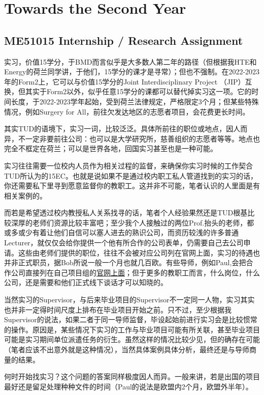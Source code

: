 \vspace{\betsubsec} %
\section{Towards the Second Year}
\subsection{ME51015 Internship / Research Assignment}
实习，价值15学分，于BMD而言似乎是大多数人第二年的路径（但根据我HTE和Energy的荷兰同学讲，于他们，15学分的课才是寻常）；但也不强制。在2022-2023年的Form2上，它可以与价值15学分的Joint Interdisciplinary Project （JIP）互换，但其实于Form2以外，似乎任意15学分的课都可以替代掉实习这一项。它的时间长度，于2022-2023学年起始，受到荷兰法律规定，严格限定3个月；但某些特殊情况，例如Surgery for All，前往欠发达地区的志愿者项目，会花费更长时间。

其实TUD的语境下，实习一词，比较泛泛。具体所前往的职位或地点，因人而异，不一定非要前往公司：也可以是大学研究所，慈善组织的志愿者等等。地点也完全不框定在荷兰；可以是世界各地，回国实习甚至也是一种可能。

实习往往需要一位校内人员作为相关过程的监督，来确保你实习时候的工作契合TUD所认为的15EC。也就是说如果不是通过校内职工私人管道找到的实习的话，你还需要私下里寻到愿意监督你的教职工。这并非不可能，笔者认识的人里面是有相关案例的。

而若是希望透过校内教授私人关系找寻的话，笔者个人经验果然还是TUD根基比较深厚的老师们资源比较丰富吧；至少我个人接触过的两位Prof.抬头的老师，都或多或少有着让他们自信可以塞人进去的熟识公司，而资历较浅的许多普通Lecturer，就仅仅会给你提供一个他有所合作的公司表单，仍需要自己去公司申请。这些由老师们提供的职位，往往不会被对应公司列在官网上面，实习的待遇也并非正式职员，据Bob所说一般一个月也就几百欧。有些导师，例如Paul,会把合作公司直接列在自己项目组的\href{https://www.bitegroup.nl/internships/}{\uline{官网上面}}；但于更多的教职工而言，什么岗位，什么公司，还是需要和他们正式线下谈话才可以知晓的。

当然实习的Supervisor，与后来毕业项目的Supervisor不一定同一人物，实习其实也并非一定得时间尺度上排布在毕业项目开始之前。只不过，至少根据我Supervisor的说法，如果二者于同一导师监督，毕设起始前进行实习会是比较惯常的操作。原因是，某些情况下实习的工作与毕业项目可能有所关联，甚至毕业项目可能是实习期间单位派遣任务的衍生。虽然这样的情况比较少见，但的确存在可能（笔者应该不出意外就是这种情况），当然具体案例具体分析，最终还是与导师商量的结果。

何时开始找实习？这个问题的答案同样极度因人而异。一般来讲，若是出国的项目最好还是留足处理种种文件的时间（Paul的说法是欧盟内2个月，欧盟外半年）。

